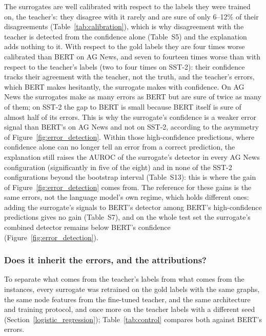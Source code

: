 The surrogates are well calibrated with respect to the labels they were trained on, the teacher's: they disagree with it rarely and are sure of only 6--12\% of their disagreements (Table~\ref{tab:calibration}), which is why disagreement with the teacher is detected from the confidence alone (Table~S5) and the explanation adds nothing to it. With respect to the gold labels they are four times worse calibrated than BERT on AG News, and seven to fourteen times worse than with respect to the teacher's labels (two to four times on SST-2): their confidence tracks their agreement with the teacher, not the truth, and the teacher's errors, which BERT makes hesitantly, the surrogate makes with confidence. On AG News the surrogates make as many errors as BERT but are sure of twice as many of them; on SST-2 the gap to BERT is small because BERT itself is sure of almost half of its errors. This is why the surrogate's confidence is a weaker error signal than BERT's on AG News and not on SST-2, according to the asymmetry of Figure~\ref{fig:error_detection}. Within those high-confidence predictions, where confidence alone can no longer tell an error from a correct prediction, the explanation still raises the AUROC of the surrogate's detector in every AG News configuration (significantly in five of the eight) and in none of the SST-2 configurations beyond the bootstrap interval (Table~S13): this is where the gain of Figure~\ref{fig:error_detection} comes from. The reference for these gains is the same errors, not the language model's own regime, which holds different ones: adding the surrogate's signals to BERT's detector among BERT's high-confidence predictions gives no gain (Table~S7), and on the whole test set the surrogate's combined detector remains below BERT's confidence (Figure~\ref{fig:error_detection}).

\subsubsection{Does it inherit the errors, and the attributions?} \label{sec:inherit_err}
To separate what comes from the teacher's labels from what comes from the instances, every surrogate was retrained on the gold labels with the same graphs, the same node features from the fine-tuned teacher, and the same architecture and training protocol, and once more on the teacher labels with a different seed (Section~\ref{logistic_regression}); Table~\ref{tab:control} compares both against BERT's errors.


